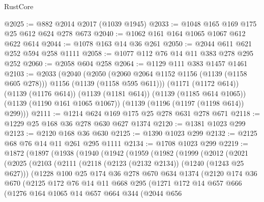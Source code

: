 \begin{lexlean}{RustCore}
\begin{coremodule}
@2025 := @882 @2014 @2017 (@1039 @1945)
@2033 := @1048 @165 @169 @175 @25 @612 @624 @278 @673
@2040 := @1062 @161 @164 @1065 @1067 @612 @622 @614
@2044 := @1078 @163 @14 @36 @261
@2050 := @2044 @611 @621 @252 @594 @258 @1111
@2058 := @1077 @112 @76 @14 @11 @383 @278 @295 @252
@2060 := @2058 @604 @258
@2064 := @1129 @111 @383 @1457 @1461
@2103 := @2033
    (@2040
      (@2050 (@2060 @2064 @1152 @1156 (@1139 (@1158 @605 @278))) @1156 (@1139 (@1158 @595 @611)))
      (@1171 (@1172 @614))
      (@1139 (@1176 @614))
      (@1139 (@1181 @614))
      (@1139 (@1185 @614 @1065))
      (@1139 (@1190 @161 @1065 @1067))
      (@1139 (@1196 (@1197 (@1198 @614)) @299)))
@2111 := @1214 @624 @169 @175 @25 @278 @631 @278 @671
@2118 := @1229 @25 @168 @36 @278 @630 @627 @1374
@2120 := @1381 @1023 @299
@2123 := @2120 @168 @36 @630
@2125 := @1390 @1023 @299
@2132 := @2125 @68 @76 @14 @11 @261 @295 @1111
@2134 := @1708 @1023 @299
@2219 := @1872
    (@1897
      (@1938
        (@1940
          (@1942
            (@1959
              (@1982
                (@1999
                  (@2012
                    (@2021
                      (@2025
                        (@2103
                          (@2111
                            (@2118 (@2123 (@2132 @2134)) (@1240 (@1243 @25 @627)))
                            (@1228
                              @100
                              @25
                              @174
                              @36
                              @278
                              @670
                              @634
                              @1374
                              (@2120
                                @174
                                @36
                                @670
                                (@2125
                                  @172
                                  @76
                                  @14
                                  @11
                                  @668
                                  @295
                                  (@1271
                                    @172
                                    @14
                                    @657
                                    @666
                                    (@1276
                                      @164
                                      @1065
                                      @14
                                      @657
                                      @664
                                      @344
                                      (@2044
                                        @656

\end{coremodule}
\end{lexlean}
